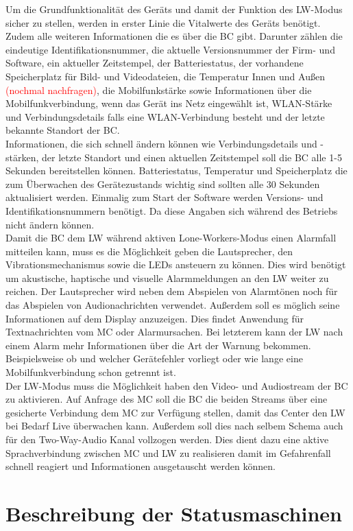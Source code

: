 \documentclass[thesis.tex]{subfiles}
\begin{document}
Um die Grundfunktionalität des Geräts und damit der Funktion des LW-Modus sicher zu stellen, werden in erster Linie
die Vitalwerte des Geräts benötigt.
Zudem alle weiteren Informationen die es über die BC gibt.
Darunter zählen die eindeutige Identifikationsnummer, die aktuelle Versionsnummer der Firm- und Software,
ein aktueller Zeitstempel, der Batteriestatus, der vorhandene Speicherplatz für Bild- und Videodateien,
die Temperatur Innen und Außen \textcolor{red}{(nochmal nachfragen)}, die Mobilfunkstärke sowie Informationen über die Mobilfunkverbindung,
wenn das Gerät ins Netz eingewählt ist, WLAN-Stärke und Verbindungsdetails falls eine WLAN-Verbindung besteht und
der letzte bekannte Standort der BC.
\\

Informationen, die sich schnell ändern können wie Verbindungsdetails und -stärken, der letzte Standort und
einen aktuellen Zeitstempel soll die BC alle 1-5 Sekunden bereitstellen können.
Batteriestatus, Temperatur und Speicherplatz die zum Überwachen des Gerätezustands wichtig sind sollten alle 30 Sekunden aktualisiert werden.
Einmalig zum Start der Software werden Versions- und Identifikationsnummern benötigt.
Da diese Angaben sich während des Betriebs nicht ändern können.
\\

Damit die BC dem LW während aktiven Lone-Workers-Modus einen Alarmfall mitteilen kann,
muss es die Möglichkeit geben die Lautsprecher, den Vibrationsmechanismus sowie die LEDs ansteuern zu können.
Dies wird benötigt um akustische, haptische und visuelle Alarmmeldungen an den LW weiter zu reichen.
Der Lautsprecher wird neben dem Abspielen von Alarmtönen noch für das Abspielen von Audionachrichten verwendet.
Außerdem soll es möglich seine Informationen auf dem Display anzuzeigen.
Dies findet Anwendung für Textnachrichten vom MC oder Alarmursachen.
Bei letzterem kann der LW nach einem Alarm mehr Informationen über die Art der Warnung bekommen.
Beispielsweise ob und welcher Gerätefehler vorliegt oder wie lange eine Mobilfunkverbindung schon getrennt ist.
\\

Der LW-Modus muss die Möglichkeit haben den Video- und Audiostream der BC zu aktivieren.
Auf Anfrage des MC soll die BC die beiden Streams über eine gesicherte Verbindung dem MC zur Verfügung stellen,
damit das Center den LW bei Bedarf Live überwachen kann.
Außerdem soll dies nach selbem Schema auch für den Two-Way-Audio Kanal vollzogen werden.
Dies dient dazu eine aktive Sprachverbindung zwischen MC und LW zu realisieren damit im Gefahrenfall schnell reagiert
und Informationen ausgetauscht werden können.

\section{Beschreibung der Statusmaschinen}


\subfilebib %
\end{document}
